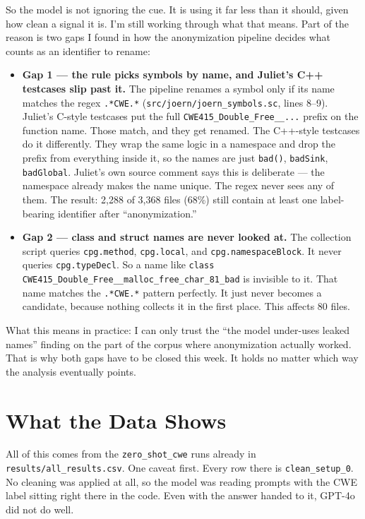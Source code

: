 \documentclass[11pt]{article}
\begin{document}
So the model is not ignoring the cue. It is using it far less than it should, given how clean a
signal it is. I'm still working through what that means. Part of the reason is two gaps I found
in how the anonymization pipeline decides what counts as an identifier to rename:

\begin{itemize}[leftmargin=*]
  \item \textbf{Gap 1 --- the rule picks symbols by name, and Juliet's C++ testcases slip past
  it.} The pipeline renames a symbol only if its name matches the regex \texttt{.*CWE.*}
  (\texttt{src/joern/joern\_symbols.sc}, lines 8--9). Juliet's C-style testcases put the full
  \texttt{CWE415\_Double\_Free\_\_...} prefix on the function name. Those match, and they get
  renamed. The C++-style testcases do it differently. They wrap the same logic in a namespace
  and drop the prefix from everything inside it, so the names are just \texttt{bad()},
  \texttt{badSink}, \texttt{badGlobal}. Juliet's own source comment says this is deliberate ---
  the namespace already makes the name unique. The regex never sees any of them. The result:
  2,288 of 3,368 files (68\%) still contain at least one label-bearing identifier after
  ``anonymization.''

  \item \textbf{Gap 2 --- class and struct names are never looked at.} The collection script
  queries \texttt{cpg.method}, \texttt{cpg.local}, and \texttt{cpg.namespaceBlock}. It never
  queries \texttt{cpg.typeDecl}. So a name like
  \texttt{class CWE415\_Double\_Free\_\_malloc\_free\_char\_81\_bad} is invisible to it. That
  name matches the \texttt{.*CWE.*} pattern perfectly. It just never becomes a candidate,
  because nothing collects it in the first place. This affects 80 files.
\end{itemize}

What this means in practice: I can only trust the ``the model under-uses leaked names'' finding
on the part of the corpus where anonymization actually worked. That is why both gaps have to be
closed this week. It holds no matter which way the analysis eventually points.

\section{What the Data Shows}
\label{sec:data}

All of this comes from the \texttt{zero\_shot\_cwe} runs already in
\texttt{results/all\_results.csv}. One caveat first. Every row there is \texttt{clean\_setup\_0}.
No cleaning was applied at all, so the model was reading prompts with the CWE label sitting right
there in the code. Even with the answer handed to it, GPT-4o did not do well.
\end{document}
